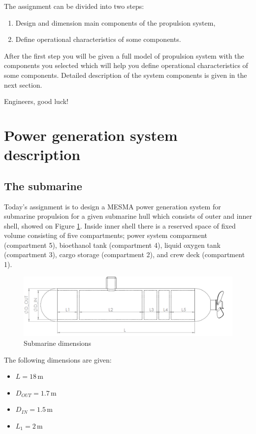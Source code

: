 \documentclass[openany]{book}
\begin{document}
	
	The assignment can be divided into two steps: 
	
	\begin{enumerate}
		\item Design and dimension main components of the propulsion system,
		\item Define operational characteristics of some components.
	\end{enumerate}
	
	After the first step you will be given a full model of propulsion system 
	with the components you selected which will help you define operational 
	characteristics of some components.
	Detailed description of the system components is given in the next section.
	
	Engineers, good luck!
	
	\newpage
	\section{Power generation system description}
	
	
	\subsection{The submarine}
	
	Today's assignment is to design a MESMA power generation system for 
	submarine propulsion for a given submarine hull which consists of outer and 
	inner shell, showed on Figure \ref{fig:side_view}. Inside inner shell 
	there is a reserved space of fixed volume consisting of five compartments;
	power system comparment (compartment 5), bioethanol tank (compartment 4), 
	liquid oxygen tank (compartment 3), cargo storage (compartment 2), and crew 
	deck (compartment 1).
	
	
	\begin{figure}[h!]
		\centering
		\includegraphics[width=\textwidth]{submarine_side_view.png}
		\caption{Submarine dimensions}
		\label{fig:side_view}
	\end{figure}
	
	The following dimensions are given:
	\begin{itemize}
		\item $L = 18 \,\textrm{m}$
		\item $D_{OUT} = 1.7 \,\textrm{m}$
		\item $D_{IN} = 1.5 \,\textrm{m}$
		\item $L_1 = 2 \,\textrm{m}$
	\end{itemize}
	
\end{document}
